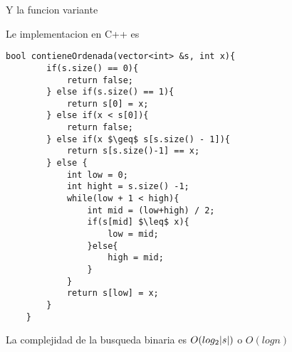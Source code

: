\documentclass[a4paper]{article}
\begin{document}
Y la funcion variante

Le implementacion en C++ es
\begin{lstlisting}[mathescape=true]
    bool contieneOrdenada(vector<int> &s, int x){
        if(s.size() == 0){
            return false;
        } else if(s.size() == 1){
            return s[0] = x;
        } else if(x < s[0]){
            return false;
        } else if(x $\geq$ s[s.size() - 1]){
            return s[s.size()-1] == x;
        } else {
            int low = 0;
            int hight = s.size() -1;
            while(low + 1 < high){
                int mid = (low+high) / 2;
                if(s[mid] $\leq$ x){
                    low = mid;
                }else{
                    high = mid;
                }
            }
            return s[low] = x;
        }
    }    
\end{lstlisting}

La complejidad de la busqueda binaria es $O(log_{2} |s|)$ o $O(log n)$
\end{document}

